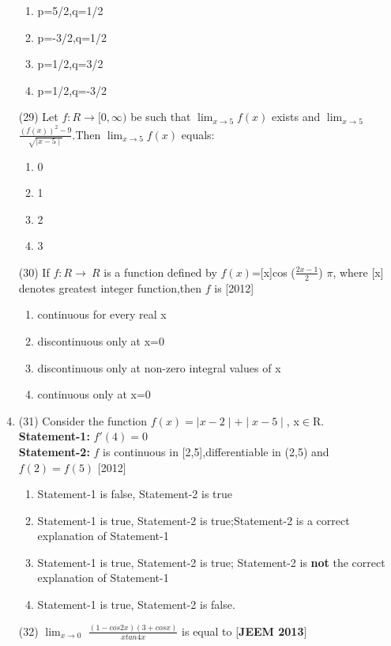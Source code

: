 \documentclass[journal,12pt,twocolumn]{IEEEtran}
\theoremstyle{remark}
\begin{document}
\begin{enumerate}
    \begin{enumerate}
        \item p=5/2,q=1/2 \item p=-3/2,q=1/2 \item p=1/2,q=3/2 \item p=1/2,q=-3/2
    \end{enumerate}
\item[(29)] Let $f:R \rightarrow [0,\infty)$ be such that $\displaystyle \lim_{x\to 5} f(x)$ exists and  $\displaystyle \lim_{x\to 5}$ $\frac{(f(x))^2-9}{\sqrt{\mid x-5\mid}}$.Then $\displaystyle \lim_{x\to 5} f(x)$ equals:
\begin{enumerate}
    \item 0\item1\item2\item3
\end{enumerate}
\item[(30)] If $f:R\rightarrow\ R$ is a function defined by $f(x)$=[x]cos ($\frac{2x-1}{2}$) $\pi$, where [x] denotes greatest integer function,then $f$ is \hfill[2012]
\begin{enumerate}
    \item continuous for every real x \item discontinuous only at x=0 \item discontinuous only at non-zero integral values of x \item continuous only at x=0
    \end{enumerate}
    \item{(31)} Consider the function $f(x)=\mid x-2\mid +\mid x-5\mid$, x$\in$R.\\ \textbf{Statement-1:} $f'(4)=0$\\ \textbf{Statement-2:} $f$ is continuous in [2,5],differentiable in (2,5) and $f(2)=f(5)$ \hfill[2012]
    \begin{enumerate}
        \item Statement-1 is false, Statement-2 is true \item Statement-1 is true, Statement-2 is true;Statement-2 is a correct explanation of Statement-1 \item Statement-1 is true, Statement-2 is true; Statement-2 is \textbf{not} the correct explanation of Statement-1 \item Statement-1 is true, Statement-2 is false.
    \end{enumerate}
    \item[(32)] $\displaystyle \lim_{x \to 0}$  $\frac{(1-cos2x)(3+cosx)}{xtan4x}$ is equal to \hfill[\textbf{JEEM 2013}]
    \begin{enumerate}

\end{enumerate}
\end{enumerate}
\end{document}
